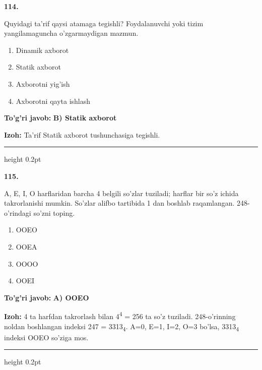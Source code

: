 \documentclass[10pt,a4paper,oneside]{article}
\begin{document}
\noindent\textbf{\color{ink}114.}
\par
Quyidagi ta'rif qaysi atamaga tegishli? Foydalanuvchi yoki tizim yangilamaguncha o'zgarmaydigan mazmun.
\begin{enumerate}[label=\Alph*),leftmargin=9mm]
\item Dinamik axborot
\item Statik axborot
\item Axborotni yig'ish
\item Axborotni qayta ishlash
\end{enumerate}
\begin{tcolorbox}[enhanced,breakable,colback=teal!4,colframe=teal!50!black,boxrule=0.5pt,arc=1.1mm,left=3mm,right=3mm,top=1.7mm,bottom=1.7mm,before skip=2mm,after skip=2mm]
\textbf{\color{teal}To'g'ri javob:} \textbf{B) Statik axborot}
\par\smallskip
\textbf{Izoh:} Ta'rif Statik axborot tushunchasiga tegishli.
\end{tcolorbox}
\vspace{2mm}\hrule height 0.2pt \vspace{3mm}

\noindent\textbf{\color{ink}115.}
\par
A, E, I, O harflaridan barcha 4 belgili so'zlar tuziladi; harflar bir so'z ichida takrorlanishi mumkin. So'zlar alifbo tartibida 1 dan boshlab raqamlangan. 248-o'rindagi so'zni toping.
\begin{enumerate}[label=\Alph*),leftmargin=9mm]
\item OOEO
\item OOEA
\item OOOO
\item OOEI
\end{enumerate}
\begin{tcolorbox}[enhanced,breakable,colback=teal!4,colframe=teal!50!black,boxrule=0.5pt,arc=1.1mm,left=3mm,right=3mm,top=1.7mm,bottom=1.7mm,before skip=2mm,after skip=2mm]
\textbf{\color{teal}To'g'ri javob:} \textbf{A) OOEO}
\par\smallskip
\textbf{Izoh:} 4 ta harfdan takrorlash bilan 4\textsuperscript{4} = 256 ta so'z tuziladi. 248-o'rinning noldan boshlangan indeksi 247 = 3313\textsubscript{4}. A=0, E=1, I=2, O=3 bo'lsa, 3313\textsubscript{4} indeksi OOEO so'ziga mos.
\end{tcolorbox}
\vspace{2mm}\hrule height 0.2pt \vspace{3mm}
\end{document}
